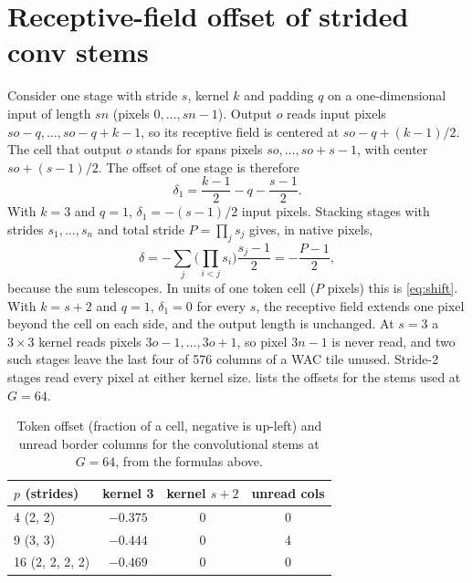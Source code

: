 \clearpage
\setcounter{page}{1}
\maketitlesupplementary
\appendix

\section{Receptive-field offset of strided conv stems}
\label{sec:supp_stem}

Consider one stage with stride $s$, kernel $k$ and padding $q$ on a one-dimensional input of length $sn$ (pixels $0,\dots,sn{-}1$). Output $o$ reads input pixels $so{-}q,\dots,so{-}q{+}k{-}1$, so its receptive field is centered at $so - q + (k{-}1)/2$. The cell that output $o$ stands for spans pixels $so,\dots,so{+}s{-}1$, with center $so + (s{-}1)/2$. The offset of one stage is therefore
\begin{equation}
  \delta_1 = \frac{k-1}{2} - q - \frac{s-1}{2}.
\end{equation}
With $k{=}3$ and $q{=}1$, $\delta_1 = -(s{-}1)/2$ input pixels. Stacking stages with strides $s_1, \dots, s_n$ and total stride $P = \prod_j s_j$ gives, in native pixels,
\begin{equation}
  \delta = -\sum_{j} \Big(\prod_{i<j} s_i\Big)\frac{s_j-1}{2} = -\frac{P-1}{2},
\end{equation}
because the sum telescopes. In units of one token cell ($P$ pixels) this is \cref{eq:shift}. With $k{=}s{+}2$ and $q{=}1$, $\delta_1{=}0$ for every $s$, the receptive field extends one pixel beyond the cell on each side, and the output length is unchanged. At $s{=}3$ a $3\times3$ kernel reads pixels $3o{-}1,\dots,3o{+}1$, so pixel $3n{-}1$ is never read, and two such stages leave the last four of 576 columns of a WAC tile unused. Stride-2 stages read every pixel at either kernel size.  lists the offsets for the stems used at $G{=}64$.

\begin{table}[h]
  \centering
  \small
  \caption{Token offset (fraction of a cell, negative is up-left) and unread border columns for the convolutional stems at $G{=}64$, from the formulas above.}
  \label{tab:supp_shift}
  \begin{tabular}{@{}lccc@{}}
    \toprule
    $p$ (strides) & kernel 3 & kernel $s{+}2$ & unread cols \\
    \midrule
    4 (2, 2)          & $-0.375$ & 0 & 0 \\
    9 (3, 3)          & $-0.444$ & 0 & 4 \\
    16 (2, 2, 2, 2)   & $-0.469$ & 0 & 0 \\
    \bottomrule
  \end{tabular}
\end{table}

